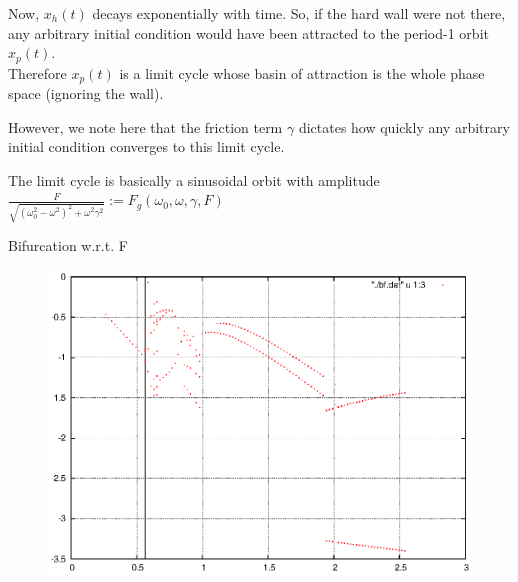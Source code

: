 \documentclass[xcolor=x11names,compress]{beamer}
\renewcommand{\(}{\begin{columns}}
\renewcommand{\)}{\end{columns}}
\newcommand{\<}[1]{\begin{column}{#1}}
\renewcommand{\>}{\end{column}}
\begin{document}
\begin{frame}
Now, $x_h(t)$ decays exponentially with time.  So, if the hard wall were not 
there, any arbitrary initial condition would have been attracted to the 
period-1 orbit 
$x_p(t)$.\\
\vspace{1em}
Therefore $x_p(t)$ is a limit cycle whose basin of attraction is the 
whole phase space (ignoring the wall).  \\

\vspace{1em}

However, we note here that the friction term $\gamma$ dictates how quickly any 
arbitrary initial condition converges to this limit cycle. \\

\vspace{1em}

The limit cycle is basically a sinusoidal orbit with amplitude $\frac{F}{\sqrt{(\omega_0^2-\omega^2)^2+\omega^2\gamma^2}}:=F_g(\omega_0,\omega,\gamma,F)$ 
\end{frame}

\begin{frame}{Bifurcation w.r.t. F}
\begin{figure}
\begin{center}
\includegraphics[width=0.9\columnwidth]{short}
\end{center}
\end{figure}
\end{frame}
\end{document}
